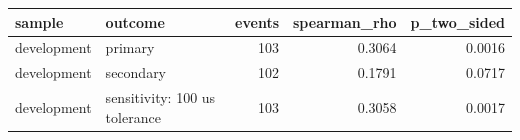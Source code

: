 \begin{tabular}{llrrr}
\toprule
sample & outcome & events & spearman_rho & p_two_sided \\
\midrule
development & primary & 103 & 0.3064 & 0.0016 \\
development & secondary & 102 & 0.1791 & 0.0717 \\
development & sensitivity: 100 us tolerance & 103 & 0.3058 & 0.0017 \\
\bottomrule
\end{tabular}
